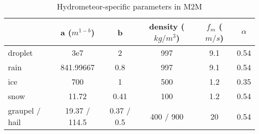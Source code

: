 \begin{table}[H]
\centering
\caption{Hydrometeor-specific parameters in M2M}
\begin{tabular}{|l|c|c|c|c|c|}
\hline
{\color[HTML]{333333} }               & {\color[HTML]{333333} a ($m^{1-b}$)} & {\color[HTML]{333333} b}          & {\color[HTML]{333333} density ($kg/m^3$)} & $f_m$ ($m/s$) & $\alpha$ \\ \hline
{\color[HTML]{333333} droplet}        & {\color[HTML]{333333} 3e7}                          & {\color[HTML]{333333} 2}          & {\color[HTML]{333333} 997}             & 9.1        & 0.54  \\ \hline
{\color[HTML]{333333} rain}           & {\color[HTML]{333333} 841.99667}                    & {\color[HTML]{333333} 0.8}        & {\color[HTML]{333333} 997}             & 9.1        & 0.54  \\ \hline
{\color[HTML]{333333} ice}            & {\color[HTML]{333333} 700}                          & {\color[HTML]{333333} 1}          & {\color[HTML]{333333} 500}             & 1.2        & 0.35  \\ \hline
{\color[HTML]{333333} snow}           & {\color[HTML]{333333} 11.72}                        & {\color[HTML]{333333} 0.41}       & {\color[HTML]{333333} 100}             & 1.2        & 0.54  \\ \hline
{\color[HTML]{333333} graupel / hail} & {\color[HTML]{333333} 19.37 / 114.5}                & {\color[HTML]{333333} 0.37 / 0.5} & {\color[HTML]{333333} 400 / 900}       & 20         & 0.54  \\ \hline
\end{tabular}
\label{table:m2m_param}
\end{table}





